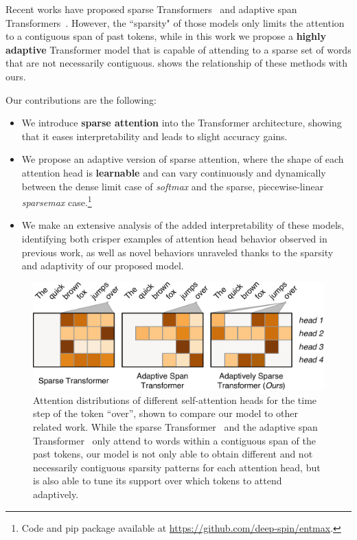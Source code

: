 \begin{sloppypar}
    Recent works have proposed sparse
    Transformers~\citep{openai_sparse_transf} and adaptive span
    Transformers~\citep{Sukhbaatar2019}. However, the ``sparsity" of those
    models only limits the attention to a contiguous span of past tokens,
    while in this work we propose a \textbf{highly adaptive} Transformer
    model that is capable of attending to a sparse set of words that are
    not necessarily contiguous.  shows the
    relationship of these methods with ours.
\end{sloppypar}

Our contributions are the following:

\begin{itemize}
    \item We introduce \textbf{sparse attention} into the
          Transformer architecture, showing that it eases
          interpretability and leads to slight accuracy gains.
    \item We propose an adaptive version of sparse attention,
          where the shape of each attention head is {\bf learnable} and can vary continuously and
          dynamically between the dense limit case of \emph{softmax} and the sparse,
          piecewise-linear \emph{sparsemax} case.\footnote{
              Code and pip package available at \url{https://github.com/deep-spin/entmax}.}
    \item We make an extensive analysis of the added interpretability of these
          models, identifying both crisper examples of attention head behavior observed in
          previous work, as well as novel behaviors unraveled thanks to the sparsity
          and adaptivity of our proposed model.
\end{itemize}

\begin{figure}[htbp]
    \centering
    \includegraphics[width=0.95\columnwidth]{Figures/comparison.pdf}
    \caption{Attention distributions of different self-attention heads for the
        time step of the token ``over'', shown to compare our model to other
        related work. While the sparse
        Transformer~\citep{openai_sparse_transf} and the adaptive span
        Transformer~\citep{Sukhbaatar2019} only attend to words within a
        contiguous span of the past tokens, our model is not only able to
        obtain different and not necessarily contiguous sparsity patterns for
        each attention head, but is also able to tune its support over which
        tokens to attend adaptively.}
    \label{fig:comparison}
\end{figure}

